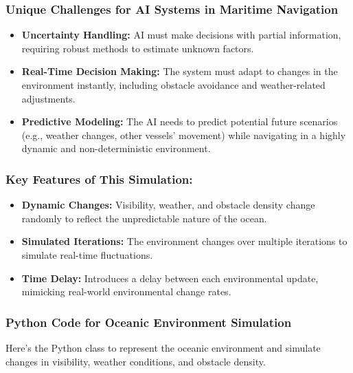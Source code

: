 \documentclass{article}
\begin{document}
\subsubsection{\large Unique Challenges for AI Systems in Maritime Navigation}
\begin{itemize}
    \item \textbf{Uncertainty Handling:} AI must make decisions with partial information, requiring robust methods to estimate unknown factors.
    \item \textbf{Real-Time Decision Making:} The system must adapt to changes in the environment instantly, including obstacle avoidance and weather-related adjustments.
    \item \textbf{Predictive Modeling:} The AI needs to predict potential future scenarios (e.g., weather changes, other vessels' movement) while navigating in a highly dynamic and non-deterministic environment.
\end{itemize}

\subsubsection{\large Key Features of This Simulation:}
\begin{itemize}
    \item \textbf{Dynamic Changes:} Visibility, weather, and obstacle density change randomly to reflect the unpredictable nature of the ocean.
    \item \textbf{Simulated Iterations:} The environment changes over multiple iterations to simulate real-time fluctuations.
    \item \textbf{Time Delay:} Introduces a delay between each environmental update, mimicking real-world environmental change rates.
\end{itemize}

\subsubsection{Python Code for Oceanic Environment Simulation}

Here’s the Python class to represent the oceanic environment and simulate changes in visibility, weather conditions, and obstacle density.
\end{document}
